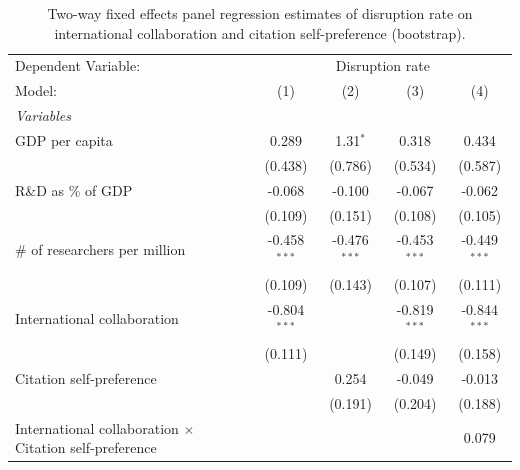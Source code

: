 
\begin{table}[H]
   \caption{\label{tab:H2_disruption} Two-way fixed effects panel regression estimates of disruption rate on international
   collaboration and citation self-preference (bootstrap).}
   \centering
   \scriptsize
   \renewcommand*{\arraystretch}{0.7}
   \begin{tabular}{lcccc}
      \tabularnewline \midrule \midrule
      Dependent Variable: & \multicolumn{4}{c}{Disruption rate}\\
      Model:                                                         & (1)            & (2)            & (3)            & (4)\\  
      \midrule
      \emph{Variables}\\
      GDP per capita                                                 & 0.289          & 1.31$^{*}$     & 0.318          & 0.434\\   
                                                                     & (0.438)        & (0.786)        & (0.534)        & (0.587)\\   
      R\&D as \% of GDP                                              & -0.068         & -0.100         & -0.067         & -0.062\\   
                                                                     & (0.109)        & (0.151)        & (0.108)        & (0.105)\\   
      \# of researchers per million                                  & -0.458$^{***}$ & -0.476$^{***}$ & -0.453$^{***}$ & -0.449$^{***}$\\   
                                                                     & (0.109)        & (0.143)        & (0.107)        & (0.111)\\   
      International collaboration                                    & -0.804$^{***}$ &                & -0.819$^{***}$ & -0.844$^{***}$\\   
                                                                     & (0.111)        &                & (0.149)        & (0.158)\\   
      Citation self-preference                                       &                & 0.254          & -0.049         & -0.013\\   
                                                                     &                & (0.191)        & (0.204)        & (0.188)\\   
      International collaboration $\times$ Citation self-preference  &                &                &                & 0.079\\   

\end{tabular}
\end{table}
